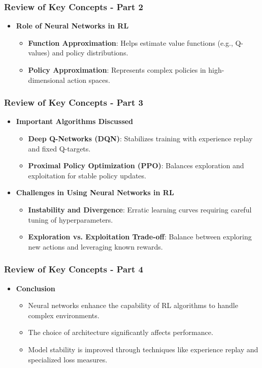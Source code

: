 \documentclass[aspectratio=169]{beamer}
\begin{document}
\begin{frame}[fragile]
    \frametitle{Review of Key Concepts - Part 2}
    \begin{itemize}
        \item \textbf{Role of Neural Networks in RL}
        \begin{itemize}
            \item \textbf{Function Approximation}: Helps estimate value functions (e.g., Q-values) and policy distributions.
            \item \textbf{Policy Approximation}: Represents complex policies in high-dimensional action spaces.
        \end{itemize}
    \end{itemize}
\end{frame}

\begin{frame}[fragile]
    \frametitle{Review of Key Concepts - Part 3}
    \begin{itemize}
        \item \textbf{Important Algorithms Discussed}
        \begin{itemize}
            \item \textbf{Deep Q-Networks (DQN)}: Stabilizes training with experience replay and fixed Q-targets.
            \item \textbf{Proximal Policy Optimization (PPO)}: Balances exploration and exploitation for stable policy updates.
        \end{itemize}
        
        \item \textbf{Challenges in Using Neural Networks in RL}
        \begin{itemize}
            \item \textbf{Instability and Divergence}: Erratic learning curves requiring careful tuning of hyperparameters.
            \item \textbf{Exploration vs. Exploitation Trade-off}: Balance between exploring new actions and leveraging known rewards.
        \end{itemize}
    \end{itemize}
\end{frame}

\begin{frame}[fragile]
    \frametitle{Review of Key Concepts - Part 4}
    \begin{itemize}
        \item \textbf{Conclusion}
        \begin{itemize}
            \item Neural networks enhance the capability of RL algorithms to handle complex environments.
            \item The choice of architecture significantly affects performance.
            \item Model stability is improved through techniques like experience replay and specialized loss measures.
        \end{itemize}
    \end{itemize}
\end{frame}
\end{document}
